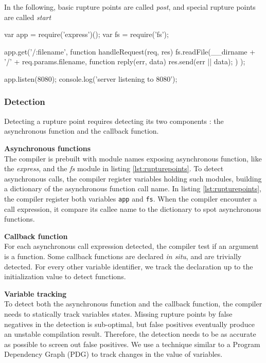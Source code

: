 In the following, basic rupture points are called \textit{post}, and special rupture points are called \textit{start}


\begin{code}[Javascript, caption={Example of an application presenting the two types of rupture points : a \texttt{start} with the call to \texttt{app.get()}, and a \texttt{post} with the call to \texttt{fs.readFile()}},label={lst:rupturepoints}]
var app = require('express')();
var fs = require('fs');

app.get('/:filename', function handleRequest(req, res) {
  fs.readFile(__dirname + '/' + req.params.filename, function reply(err, data) {
    res.send(err || data);
  })
});

app.listen(8080);
console.log('server listening to 8080');
\end{code}

\subsubsection{Detection}

Detecting a rupture point requires detecting its two components : the asynchronous function and the callback function.

\textbf{Asynchronous functions}\\
The compiler is prebuilt with module names exposing asynchronous function, like the \textit{express}, and the \textit{fs} module in listing \ref{lst:rupturepoints}.
To detect asynchronous calls, the compiler register variables holding such modules, building a dictionary of the asynchronous function call name.
In listing \ref{lst:rupturepoints}, the compiler register both variables \texttt{app} and \texttt{fs}.
When the compiler encounter a call expression, it compare its callee name to the dictionary to spot asynchronous functions.

\textbf{Callback function}\\
For each asynchronous call expression detected, the compiler test if an argument is a function.
Some callback functions are declared \textit{in situ}, and are trivially detected.
For every other variable identifier, we track the declaration up to the initialization value to detect functions.

\textbf{Variable tracking}\\
To detect both the asynchronous function and the callback function, the compiler needs to statically track variables states.
Missing rupture points by false negatives in the detection is sub-optimal, but false positives eventually produce an unstable compilation result.
Therefore, the detection needs to be as accurate as possible to screen out false positives.
We use a technique similar to a Program Dependency Graph (PDG)\cite{Ferrante1987} to track changes in the value of variables.


